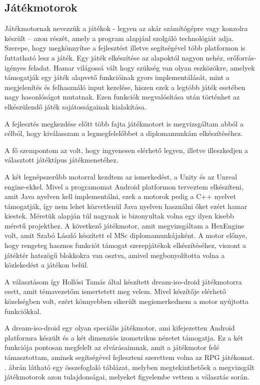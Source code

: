 \subsection{Játékmotorok}
\label{jatekmotor}

Játékmotornak nevezzük a játékok - legyen az akár számítógépre vagy konzolra készült – azon részét, amely a program alapjául szolgáló technológiát adja. 
Szerepe, hogy megkönnyítse a fejlesztést illetve segítségével több platformon is futtatható lesz a játék.
Egy játék elkészítése az alapoktól nagyon nehéz, erőforrás-igényes feladat. 
Hamar világossá vált hogy szükség van olyan eszközökre, amelyek támogatják egy játék alapvető funkcióinak gyors implementálását, mint a megjelenítés és felhasználó input kezelése, hiszen ezek a legtöbb játék esetében nagy hasonlóságot mutatnak. 
Ezen funkciók megvalósítása után történhet az elkészülendő játék sajátosságainak kialakítása.
 
A fejlesztés megkezdése előtt több fajta játékmotort is megvizsgáltam abból a célból, hogy kiválasszam a legmegfelelőbbet a diplomamunkám elkészítéséhez. 

A fő szempontom az volt, hogy ingyenesen elérhető legyen, illetve illeszkedjen a választott játéktípus játékmenetéhez.

A két legnépszerűbb motorral kezdtem az ismerkedést, a Unity és az Unreal engine-ekkel. 
Mivel a programomat Android platformon terveztem elkészíteni, amit Java nyelven kell implementálni, ezek a motorok pedig a C++ nyelvet támogatják, így nem lehet közvetlenül Java nyelven használni őket ezért hamar kiestek. 
Méretük alapján túl nagynak is bizonyultak volna egy ilyen kisebb méretű projekthez. 
A következő játékmotor, amit megvizsgáltam a HexEngine volt, amit Szabó László készített el MSc diplomamunkájaként. 
A motor előnye, hogy rengeteg hasznos funkciót támogat szerepjátékok elkészítéséhez, viszont a játéktér hatszögű blokkokra van osztva, amivel megbonyolította volna a közlekedést a játékon belül.

A választásom így Hollósi Tamás által készített dream-iso-droid játékmotorra esett, amit témavezetőm ismertetett meg velem. \cite{dreamisodroid}
Mivel készítője elérhető közelségben volt, ezért könnyebben sikerült megismerkednem a motor nyújtotta funkciókkal.


A dream-iso-droid egy olyan speciális játékmotor, ami kifejezetten Android platformra készült és a két dimenziós izometrikus nézetet támogatja. 
Ez a két funkciója pontosan megfelelt az elvárásaimnak, amit a játékmotor felé támasztottam, aminek segítségével fejleszteni szerettem volna az RPG játékomat.
. ábrán látható egy összefoglaló táblázat, melyben megtekinthetőek a megvizsgált játékmotorok azon tulajdonságai, melyeket figyelembe vettem a választás során. 


